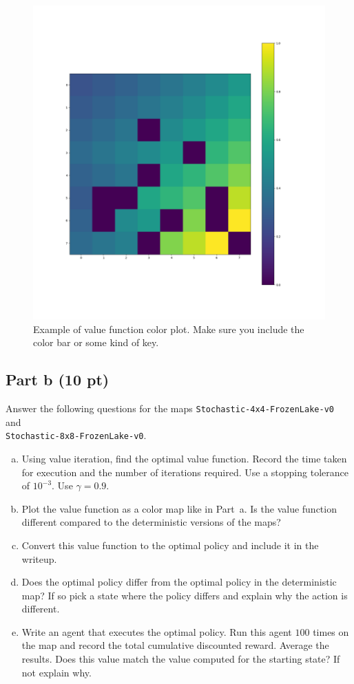 \documentclass[12pt]{article}
\begin{document}
\begin{figure}[ht]
  \centering
  \includegraphics[width=.5\textwidth]{figures/value_function_plot.png}
  \caption{\label{fig:prob3_value_image} Example of value function
    color plot. Make sure you include the color bar or some kind of key.}
\end{figure}


\subsection*{Part b (10 pt)}

Answer the following questions for the maps
\texttt{Stochastic-4x4-FrozenLake-v0} and \\
\texttt{Stochastic-8x8-FrozenLake-v0}.

\begin{enumerate}[a)]
\item Using value iteration, find the optimal value function. Record
  the time taken for execution and the number of iterations required. Use a
  stopping tolerance of $10^{-3}$. Use $\gamma=0.9$.
\item Plot the value function as a color map like in Part~a. Is the
  value function different compared to the deterministic versions of
  the maps?
\item Convert this value function to the optimal policy and include it
  in the writeup.
\item Does the optimal policy differ from the optimal policy in the 
  deterministic map? 
  If so pick a state where the policy differs and explain why the action is
  different.
\item Write an agent that executes the optimal policy. Run this agent
  $100$ times on the map and record the total cumulative discounted
  reward. Average the results. Does this value match the value
  computed for the starting state? If not explain why.
\end{enumerate}
\end{document}
